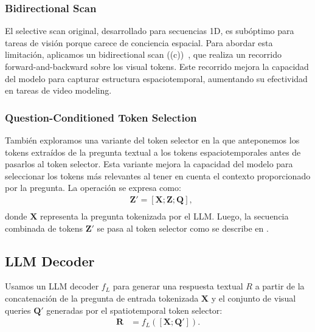 \subsubsection{Bidirectional Scan} El selective scan original, desarrollado para secuencias 1D, es subóptimo para tareas de visión porque carece de conciencia espacial. Para abordar esta limitación, aplicamos un bidirectional scan ((c))~\cite{li2025videomamba}, que realiza un recorrido forward-and-backward sobre los visual tokens. Este recorrido mejora la capacidad del modelo para capturar estructura espaciotemporal, aumentando su efectividad en tareas de video modeling.

\subsubsection{Question-Conditioned Token Selection} También exploramos una variante del token selector en la que anteponemos los tokens extraídos de la pregunta textual a los tokens espaciotemporales antes de pasarlos al token selector. Esta variante mejora la capacidad del modelo para seleccionar los tokens más relevantes al tener en cuenta el contexto proporcionado por la pregunta. La operación se expresa como:
\begin{equation}
    \begin{aligned}
    &\mathbf{Z'} = [\mathbf{X};\mathbf{Z}; \mathbf{Q}], \\
    \end{aligned}
\end{equation}
donde $\mathbf{X}$ representa la pregunta tokenizada por el LLM. Luego, la secuencia combinada de tokens $\mathbf{Z'}$ se pasa al token selector como se describe en .

\subsection{LLM Decoder}

Usamos un LLM decoder $f_L$ para generar una respuesta textual $R$ a partir de la concatenación de la pregunta de entrada tokenizada $\mathbf{X}$ y el conjunto de visual queries $\mathbf{Q'}$ generadas por el spatiotemporal token selector:
\begin{equation}
    \begin{aligned}
    \mathbf{R} &= f_L(\left[ \mathbf{X}; \mathbf{Q'}\right]).
    \end{aligned}
\end{equation}
